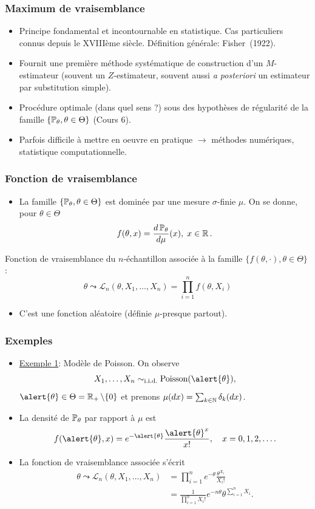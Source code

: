\begin{frame}
\frametitle{Maximum de vraisemblance}
\begin{itemize}
\item Principe \alert{ fondamental} et
\alert{incontournable} en statistique. Cas particuliers connus
depuis le XVIII\`eme si\`ecle. D\'efinition g\'en\'erale:
Fisher~(1922).
\item Fournit une première \alert{méthode systématique} de construction d'un $M$-estimateur
(souvent un $Z$-estimateur, souvent aussi {\it a posteriori} un
estimateur par substitution simple).
\item Procédure \alert{optimale} (dans quel sens ?)
sous des hypothèses de \alert{ régularité} de la famille
$\{\operatorname{{\mathbb P}}_\theta, \theta \in \Theta\}$ (Cours 6).
\item Parfois difficile à mettre en oeuvre en pratique
$\rightarrow$ \alert{méthodes numériques}, statistique
computationnelle.
\end{itemize}
\end{frame}

\begin{frame}
\frametitle{Fonction de vraisemblance}
\begin{itemize}
\item La famille $\{\operatorname{{\mathbb P}}_\theta,\theta \in \Theta\}$ est dominée par une mesure $\sigma$-finie $\mu$. On se donne, pour $\theta \in \Theta$
$$f(\theta,x) = \frac{d\operatorname{{\mathbb P}}_\theta}{d\mu}(x),\;x \in \operatorname{{\mathbb R}}.$$
\end{itemize}
\begin{df}
\alert{Fonction de vraisemblance} du $n$-échantillon associée à la famille $\{f(\theta,\cdot),\theta \in \Theta\}$ :
$$\boxed{\theta \leadsto {\mathcal L}_n(\theta, X_1,\ldots, X_n) = \prod_{i = 1}^n f(\theta, X_i)}$$
\end{df}
\begin{itemize}
\item C'est une fonction aléatoire (définie $\mu$-presque partout).
\end{itemize}
\end{frame}

\begin{frame}
\frametitle{Exemples}
\begin{itemize}
\item \underline{Exemple 1}: \alert{Modèle de Poisson}. On observe
$$X_1,\ldots, X_n \sim_{\text{i.i.d.}}\text{Poisson}(\alert{\theta}),$$
$\alert{\theta} \in \Theta = \R_+\setminus \{0\}$ et prenons
$\mu(dx) = \sum_{k \in \operatorname{{\mathbb N}}}\delta_k(dx)$.
\item La densit\'e de $\operatorname{{\mathbb P}}_\theta$ par rapport \`a $\mu$ est
$$f(\alert{\theta}, x) = e^{-\alert{\theta}}
\frac{\alert{\theta}^x}{x!}, \quad x=0,1,2,\dots.$$
\item La \alert{ fonction de vraisemblance} associée s'écrit
\begin{align*}
\theta \leadsto {\mathcal L}_n(\theta, X_1,\ldots, X_n)
&= \prod_{i = 1}^n e^{-\theta}\frac{\theta^{X_i}}{X_i!} \\
&= \frac{1}{\prod_{i = 1}^nX_i!} e^{-n\theta} \theta^{\sum_{i = 1}^n X_i}.
\end{align*}
\end{itemize}
\end{frame}

